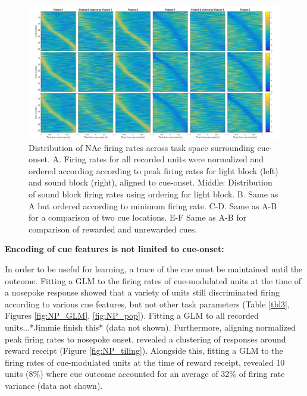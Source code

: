\documentclass[11pt]{article}
\begin{document}
\begin{figure}[h]
\centering
\includegraphics[width=\textwidth]{Fig 8 - Task tiling.png}
\caption{Distribution of NAc firing rates across task space surrounding cue-onset. A. Firing rates for all recorded units were normalized and ordered according according to peak firing rates for light block (left) and sound block (right), aligned to cue-onset. Middle: Distribution of sound block firing rates using ordering for light block. B. Same as A but ordered according to minimum firing rate. C-D. Same as A-B for a comparison of two cue locations. E-F Same as A-B for comparison of rewarded and unrewarded cues.}
\label{fig:tiling}
\end{figure}
 
{\bf Encoding of cue features is not limited to cue-onset:}

In order to be useful for learning, a trace of the cue must be maintained until the outcome. Fitting a GLM to the firing rates of cue-modulated units at the time of a nosepoke response showed that a variety of units still discriminated firing according to various cue features, but not other task parameters (Table \ref{tbl3}, Figures \ref{fig:NP_GLM}, \ref{fig:NP_pop}). Fitting a GLM to all recorded units...*Jimmie finish this* (data not shown). Furthermore, aligning normalized peak firing rates to nosepoke onset, revealed a clustering of responses around reward receipt (Figure \ref{fig:NP_tiling}). Alongside this, fitting a GLM to the firing rates of cue-modulated units at the time of reward receipt, revealed 10 units (8\%) where cue outcome accounted for an average of 32\% of firing rate variance (data not shown). 
\end{document}
